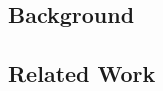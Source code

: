\subsection{Background}\label{sec:background}


\subsection{Related Work}\label{sec:related-works}














